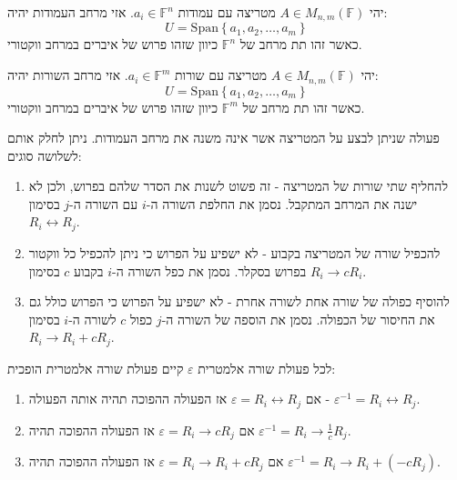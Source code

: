 \documentclass{tstextbook}
\begin{document}
\begin{definition}
יהי \(A \in M_{n,m}\left( \mathbb{F}  \right)\) מטריצה עם עמודות \(a_{i}\in \mathbb{F}^{n}\). אזי מרחב העמודות יהיה:
$$U=\mathrm{Span}\left\{  a_{1},a_{2},\dots,a_{m}  \right\}$$
כאשר זהו תת מרחב של \(\mathbb{F} ^{n}\) כיוון שזהו פרוש של איברים במרחב ווקטורי.

\end{definition}
\begin{definition}
יהי \(A \in M_{n,m}\left( \mathbb{F}  \right)\) מטריצה עם שורות \(a_{i}\in \mathbb{F}^{m}\). אזי מרחב השורות יהיה:
$$U=\mathrm{Span}\left\{  a_{1},a_{2},\dots,a_{m}  \right\}$$
כאשר זהו תת מרחב של \(\mathbb{F} ^{m}\) כיוון שזהו פרוש של איברים במרחב ווקטורי.

\end{definition}
\begin{definition}
פעולה שניתן לבצע על המטריצה אשר אינה משנה את מרחב העמודות. ניתן לחלק אותם לשלושה סוגים:

  \begin{enumerate}
    \item להחליף שתי שורות של המטריצה - זה פשוט לשנות את הסדר שלהם בפרוש, ולכן לא ישנה את המרחב המתקבל. נסמן את החלפת השורה ה-\(i\) עם השורה ה-\(j\) בסימון \(R_{i}\leftrightarrow R_{j}\). 


    \item להכפיל שורה של המטריצה בקבוע - לא ישפיע על הפרוש כי ניתן להכפיל כל ווקטור בפרוש בסקלר. נסמן את כפל השורה ה-\(i\) בקבוע \(c\) בסימון \(R_{i}\to cR_{i}\). 


    \item להוסיף כפולה של שורה אחת לשורה אחרת - לא ישפיע על הפרוש כי הפרוש כולל גם את החיסור של הכפולה. נסמן את הוספה של השורה ה-\(j\) כפול \(c\) לשורה ה-\(i\) בסימון \(R_{i}\to R_{i}+cR_{j}\). 


  \end{enumerate}
\end{definition}
\begin{proposition}
לכל פעולת שורה אלמטרית \(\varepsilon\) קיים פעולת שורה אלמטרית הופכית:

  \begin{enumerate}
    \item אם \(\varepsilon=R_{i}\leftrightarrow R_{j}\) אז הפעולה ההפוכה תהיה אותה הפעולה - \(\varepsilon ^{-1}=R_{i}\leftrightarrow R_{j}\). 


    \item אם \(\varepsilon=R_{i}\to cR_{j}\) אז הפעולה ההפוכה תהיה \(\varepsilon ^{-1}=R_{i}\to \frac{1}{c}R_{j}\). 


    \item אם \(\varepsilon=R_{i}\to R_{i}+cR_{j}\) אז הפעולה ההפוכה תהיה \(\varepsilon ^{-1}=R_{i}\to R_{i}+(-cR_{j})\). 


  \end{enumerate}
\end{proposition}
\end{document}
